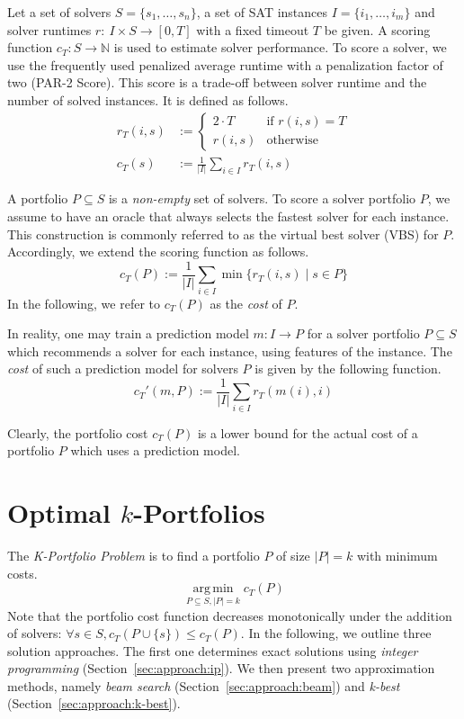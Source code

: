 \documentclass[conference]{IEEEtran}
\DeclareMathOperator*{\argmin}{arg\,min}
\begin{document}
Let a set of solvers $S = \{s_1, \dots, s_n\}$, a set of SAT instances $I = \{i_1, \dots, i_m\}$ and solver runtimes $r:~I \times S \rightarrow [0, T]$ with a fixed timeout $T$ be given.
A scoring function $c_T : S \rightarrow \mathbb{N}$ is used to estimate solver performance. 
To score a solver, we use the frequently used penalized average runtime with a penalization factor of two (PAR-2 Score). 
This score is a trade-off between solver runtime and the number of solved instances.
It is defined as follows.%
\begin{align}
r_T(i,s) &:= \begin{cases}
	2 \cdot T & \text{if }r(i,s) = T\\
	r(i,s) & \text{otherwise}
\end{cases} \tag*{Penalized Runtimes}\\[.5em]
c_T(s) &:= \frac{1}{|I|} \sum_{i \in I}{r_T(i,s)} \tag*{PAR-2 Score}
\end{align}

A portfolio $P \subseteq S$ is a \emph{non-empty} set of solvers.
To score a solver portfolio $P$, we assume to have an oracle that always selects the fastest solver for each instance. 
This construction is commonly referred to as the virtual best solver (VBS) for $P$. 
Accordingly, we extend the scoring function as follows.%
$$
	c_{T}(P) := \frac{1}{|I|} \sum\limits_{i \in I}{\min\{r_T(i,s) \mid s \in P\}}
$$
In the following, we refer to $c_{T}(P)$ as the \emph{cost} of $P$. 

In reality, one may train a prediction model $m : I \rightarrow P$ for a solver portfolio $P \subseteq S$ which recommends a solver for each instance, using features of the instance. 
The \emph{cost} of such a prediction model for solvers $P$ is given by the following function.%
$$
	c_{T}'(m,P) := \frac{1}{|I|} \sum\limits_{i \in I}{r_T(m(i),i)}
$$

Clearly, the portfolio cost $c_{T}(P)$ is a lower bound for the actual cost of a portfolio $P$ which uses a prediction model.

\section{Optimal \texorpdfstring{$k$}{k}-Portfolios} %
\label{sec:approach}

The \emph{K-Portfolio Problem} is to find a portfolio $P$ of size $|P| = k$ with minimum costs.%
$$
\argmin\limits_{P \subseteq S, |P| = k} c_{T}(P)
$$
Note that the portfolio cost function decreases monotonically under the addition of solvers: $\forall s \in S, c_{T}(P \cup \{s\}) \leq c_{T}(P)$. 
In the following, we outline three solution approaches. 
The first one determines exact solutions using \emph{integer programming} (Section~\ref{sec:approach:ip}). 
We then present two approximation methods, namely \emph{beam search} (Section~\ref{sec:approach:beam}) and \emph{k-best} (Section~\ref{sec:approach:k-best}). 
\end{document}
